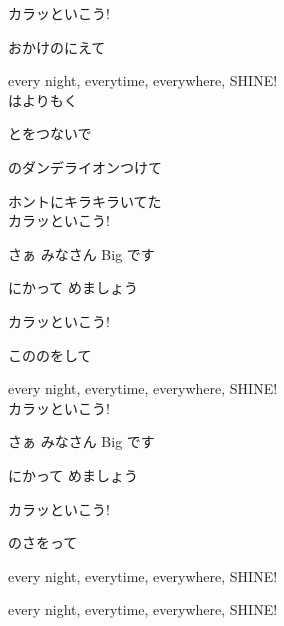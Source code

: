 {カラッといこう!

おかけのにえて

every night, everytime, everywhere, SHINE!
\\

はよりもく

とをつないで

 のダンデライオンつけて

ホントにキラキラいてた
\\

カラッといこう!

さぁ みなさん Big です

にかって めましょう

カラッといこう!

こののをして

every night, everytime, everywhere, SHINE!
\\

カラッといこう!

さぁ みなさん Big です

にかって めましょう

カラッといこう!

のさをって

every night, everytime, everywhere, SHINE!

every night, everytime, everywhere, SHINE!

}